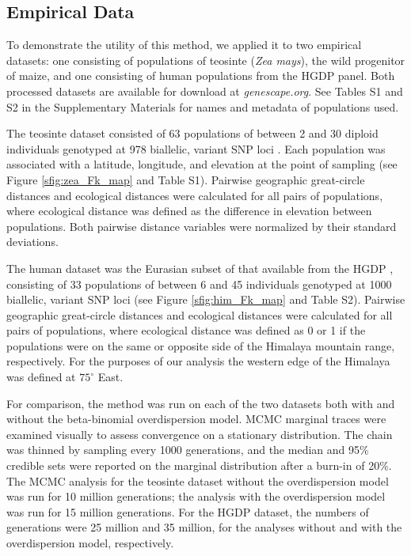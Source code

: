 \subsection*{Empirical Data}
To demonstrate the utility of this method, we applied it to two empirical datasets: one consisting of populations of teosinte (\textit{Zea mays}), the wild progenitor of maize, and one consisting of human populations from the HGDP panel.  Both processed datasets are available for download at \emph{genescape.org}. 
See Tables S1 and S2 in the Supplementary Materials  for names and metadata of populations used. 

The teosinte dataset consisted of 63 populations of between 2 and 30 diploid individuals genotyped at 978 biallelic, variant SNP loci \citep{Fang2012}.  Each population was associated with a latitude, longitude, and elevation at the point of sampling (see Figure \ref{sfig:zea_Fk_map} and Table S1).  Pairwise geographic great-circle distances and ecological distances were calculated for all pairs of populations, where ecological distance was defined as the difference in elevation between populations.  Both pairwise distance variables were normalized by their standard deviations.  

The human dataset was the Eurasian subset of that available from the HGDP \citep{Conrad2006, Li2008}, consisting of 33 populations of between 6 and 45 individuals genotyped at 1000 biallelic, variant SNP loci (see Figure \ref{sfig:him_Fk_map} and Table S2).  Pairwise geographic great-circle distances and ecological distances were calculated for all pairs of populations, where ecological distance was defined as 0 or 1 if the populations were on the same or opposite side of the Himalaya mountain range, respectively. For the purposes of our analysis the western edge of the Himalaya was defined at $75^{\circ}$ East. 

For comparison, the method was run on each of the two datasets both with and without the beta-binomial overdispersion model.  MCMC marginal traces were examined visually to assess convergence on a stationary distribution.  The chain was thinned by sampling every 1000 generations, and the median and 95\% credible sets were reported on the marginal distribution after a burn-in of 20\%.  The MCMC analysis for the teosinte dataset without the overdispersion model was run for 10 million generations; the analysis with the overdispersion model was run for 15 million generations.  For the HGDP dataset, the numbers of generations were 25 million and 35 million, for the analyses without and with the overdispersion model, respectively.


